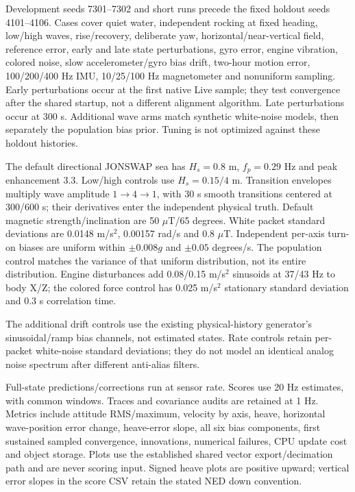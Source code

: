\documentclass[conference]{IEEEtran}
\begin{document}
Development seeds 7301--7302 and short runs precede the fixed holdout seeds
4101--4106. Cases cover quiet water, independent rocking at fixed heading,
low/high waves, rise/recovery, deliberate yaw, horizontal/near-vertical
field, reference error, early and late state perturbations, gyro error,
engine vibration, colored noise, slow accelerometer/gyro bias drift, two-hour motion error, 100/200/400 Hz IMU,
10/25/100 Hz magnetometer and nonuniform sampling. Early perturbations
occur at the first native Live sample; they test convergence after the
shared startup, not a different alignment algorithm. Late perturbations
occur at 300 s. Additional wave arms match synthetic white-noise models,
then separately the population bias prior. Tuning is not optimized against
these holdout histories.

The default directional JONSWAP sea has $H_s=0.8$ m,
$f_p=0.29$ Hz and peak enhancement 3.3. Low/high controls use
$H_s=0.15/4$ m. Transition envelopes multiply wave amplitude
$1\to4\to1$, with 30 s smooth transitions centered at 300/600 s;
their derivatives enter the independent physical truth. Default magnetic
strength/inclination are 50 $\mu$T/65 degrees. White packet standard
deviations are 0.0148 m/s$^2$, 0.00157 rad/s and 0.8 $\mu$T.
Independent per-axis turn-on biases are uniform within
$\pm0.008g$ and $\pm0.05$ degrees/s. The population control matches
the variance of that uniform distribution, not its entire distribution.
Engine disturbances add 0.08/0.15 m/s$^2$ sinusoids at 37/43 Hz
to body X/Z; the colored force control has 0.025 m/s$^2$ stationary
standard deviation and 0.3 s correlation time.

The additional drift controls use the existing physical-history generator's
sinusoidal/ramp bias channels, not estimated states. Rate controls retain
per-packet white-noise standard deviations; they do not model an identical
analog noise spectrum after different anti-alias filters.

Full-state predictions/corrections run at sensor rate. Scores use 20 Hz
estimates, with common windows. Traces and covariance audits are retained at
1 Hz. Metrics include attitude RMS/maximum, velocity by axis, heave,
horizontal wave-position error change, heave-error slope, all six bias
components, first sustained sampled convergence, innovations, numerical failures,
CPU update cost and object storage. Plots use the established shared vector
export/decimation path and are never scoring input.
Signed heave plots are positive upward; vertical error slopes in the score
CSV retain the stated NED down convention.
\end{document}
